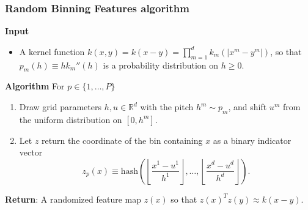 \begin{frame}
    \frametitle{Random Binning Features algorithm}

    \textbf{Input}
     \begin{itemize}
        \item A kernel function $k(x,y) = k(x-y) =  \prod_{m=1}^d k_m(|x^m - y^m|)$, so that $p_m(h) \equiv h k_m''(h)$ is a probability distribution on $h \geq 0$.
    \end{itemize}
    
      
    \textbf{Algorithm} For $p \in \{1,\ldots, P\}$
    \begin{enumerate}
        \item  Draw grid parameters $h, u \in \mathbb{R}^d$ with the pitch $h^m \sim p_m$, and shift $u^m$ from the uniform distribution on $[0, h^m]$.
         \item Let $z$ return the coordinate of the bin containing $x$ as a binary indicator vector 
         $$
         z_p(x) \equiv 
         \text{hash}
         \left(
            \left\lfloor 
                \frac{x^1 - u^1}{h^1} 
            \right\rfloor,
             \dots, 
             \left\lfloor
                \frac{x^d - u^d}{h^d} 
            \right\rfloor
         \right).
         $$ 
    \end{enumerate}
    \textbf{Return}: A randomized feature map $z(x)$ so that $z(x)^Tz(y) \approx k(x-y)$.

\end{frame}

